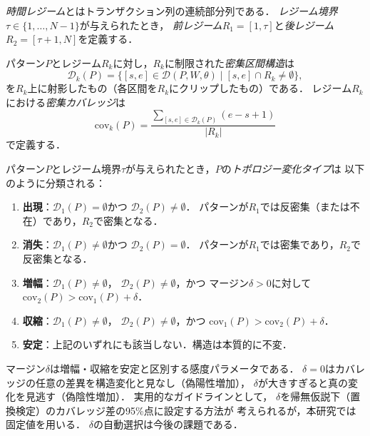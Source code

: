 \begin{definition}[時間レジーム]\label{def:regime}
\emph{時間レジーム}とはトランザクション列の連続部分列である．
\emph{レジーム境界}$\tau \in \{1, \ldots, N-1\}$が与えられたとき，
\emph{前レジーム}$R_1 = [1, \tau]$と\emph{後レジーム}$R_2 = [\tau+1, N]$を定義する．
\end{definition}

\begin{definition}[密集区間構造]\label{def:dis}
パターン$P$とレジーム$R_k$に対し，$R_k$に制限された\emph{密集区間構造}は
\begin{equation}
\mathcal{D}_k(P) = \{[s, e] \in \mathcal{D}(P, W, \theta) \mid [s, e] \cap R_k \neq \emptyset\},
\end{equation}
を$R_k$上に射影したもの（各区間を$R_k$にクリップしたもの）である．
レジーム$R_k$における\emph{密集カバレッジ}は
\begin{equation}
\text{cov}_k(P) = \frac{\sum_{[s,e] \in \mathcal{D}_k(P)} (e - s + 1)}{|R_k|}
\end{equation}
で定義する．
\end{definition}

\begin{definition}[パターンのトポロジー変化]\label{def:topology_change}
パターン$P$とレジーム境界$\tau$が与えられたとき，$P$の\emph{トポロジー変化タイプ}は
以下のように分類される：
\begin{enumerate}
\item \textbf{出現}：$\mathcal{D}_1(P) = \emptyset$かつ
  $\mathcal{D}_2(P) \neq \emptyset$．
  パターンが$R_1$では反密集（または不在）であり，$R_2$で密集となる．
\item \textbf{消失}：$\mathcal{D}_1(P) \neq \emptyset$かつ
  $\mathcal{D}_2(P) = \emptyset$．
  パターンが$R_1$では密集であり，$R_2$で反密集となる．
\item \textbf{増幅}：$\mathcal{D}_1(P) \neq \emptyset$，
  $\mathcal{D}_2(P) \neq \emptyset$，かつ
  マージン$\delta > 0$に対して$\text{cov}_2(P) > \text{cov}_1(P) + \delta$．
\item \textbf{収縮}：$\mathcal{D}_1(P) \neq \emptyset$，
  $\mathcal{D}_2(P) \neq \emptyset$，かつ
  $\text{cov}_1(P) > \text{cov}_2(P) + \delta$．
\item \textbf{安定}：上記のいずれにも該当しない．構造は本質的に不変．
\end{enumerate}
\end{definition}

\begin{remark}
マージン$\delta$は増幅・収縮を安定と区別する感度パラメータである．
$\delta = 0$はカバレッジの任意の差異を構造変化と見なし（偽陽性増加），
$\delta$が大きすぎると真の変化を見逃す（偽陰性増加）．
実用的なガイドラインとして，
$\delta$を帰無仮説下（置換検定）のカバレッジ差の95\%点に設定する方法が
考えられるが，本研究では固定値を用いる．
$\delta$の自動選択は今後の課題である．
\end{remark}

